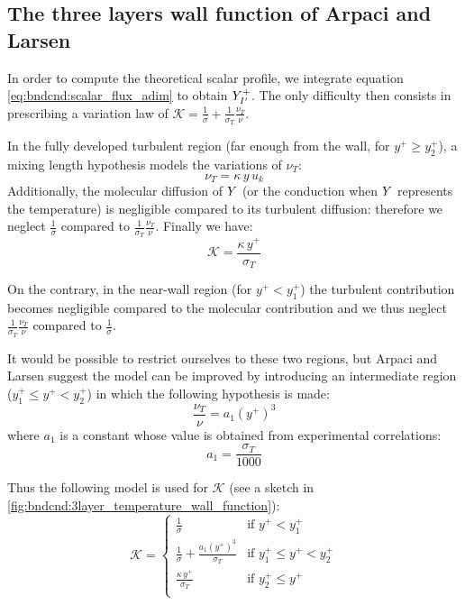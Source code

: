 \subsection{The three layers wall function of Arpaci and Larsen}

In order to compute the theoretical scalar profile, we integrate
equation \eqref{eq:bndcnd:scalar_flux_adim} to obtain
$Y^+_{{I^\prime}}$.
The only difficulty then consists in prescribing a variation law of
$\mathcal{K}=\displaystyle\frac{1}{\sigma}+ \displaystyle\frac{1}{\sigma_T}\frac{\nu_T}{\nu}$.

In the fully developed turbulent region
(far enough from the wall, for $y^+\geqslant y^+_2$),
a mixing length hypothesis models the variations of
$\nu_T$:
\begin{equation}
\nu_T = \kappa \,y\,u_k
\end{equation}
Additionally, the molecular diffusion of $Y$
(or the conduction when $Y$ represents the temperature)
is negligible compared to its turbulent diffusion: therefore
we neglect
$\displaystyle\frac{1}{\sigma}$ compared to
$\displaystyle\frac{1}{\sigma_T}\frac{\nu_T}{\nu}$.
Finally we have:
\begin{equation}
\mathcal{K}= \displaystyle\frac{\kappa \,y^+}{\sigma_T}
\end{equation}

On the contrary, in the near-wall region (for $y^+ < y^+_1$)
the turbulent contribution becomes negligible
compared to the molecular contribution and we thus neglect
$\displaystyle\frac{1}{\sigma_T}\frac{\nu_T}{\nu}$ compared to
$\displaystyle\frac{1}{\sigma}$.

It would be possible to restrict ourselves to these
two regions, but Arpaci and Larsen suggest the model
can be improved by introducing an intermediate
region ($y^+_1 \leqslant y^+ < y^+_2$)
in which the following hypothesis is made:
\begin{equation}
\frac{\nu_T}{\nu} = a_1 \left( y^+ \right)^3
\end{equation}
where $a_1$ is a constant whose value is obtained from
experimental correlations:
\begin{equation}
a_1 =\displaystyle\frac{\sigma_T}{1000}
\end{equation}

Thus the following model is used for $\mathcal{K}$
(see a sketch
in \figurename~ \ref{fig:bndcnd:3layer_temperature_wall_function}):
\begin{equation}
\mathcal{K}=\left\{
\begin{array}{ll}
\displaystyle\frac{1}{\sigma}
             &\text{if } y^+ < y^+_1\\
\displaystyle\frac{1}{\sigma}
+\displaystyle\frac{a_1 (y^+)^3}{\sigma_T}
             &\text{if } y^+_1 \leqslant y^+ < y^+_2\\
\displaystyle\frac{\kappa \,y^+}{\sigma_T}
             &\text{if } y^+_2\leqslant y^+\\
\end{array}
\right.
\end{equation}

